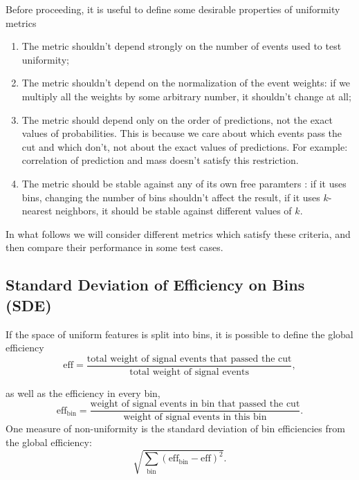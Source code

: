 Before proceeding, it is useful to define some desirable properties of uniformity metrics
\begin{enumerate}
\item
The metric shouldn't depend strongly on the number of events used to test uniformity;
\item
The metric shouldn't depend on the normalization of the event weights: if we multiply all the weights by some arbitrary number, it shouldn't change at all;
\item 
The metric should depend only on the order of predictions, not the exact values of probabilities.
This is because we care about which events pass the cut and which don't, not about the exact values of predictions.
For example: correlation of prediction and mass doesn't satisfy this restriction.
\item
The metric should be stable against any of its own free paramters : if it uses bins, changing the number of bins shouldn't affect the result,
if it uses $k$-nearest neighbors, it should be stable against different values of $k$.
\end{enumerate}
In what follows we will consider different metrics which satisfy these criteria, and then compare their performance in
some test cases.

\subsection{Standard Deviation of Efficiency on Bins (SDE)}

\def\bineff{\text{eff}_\text{bin}}
\def\binweight{\text{weight}_\text{bin}}
\def\globaleff{\text{eff}}
\def\SDE{\text{SDE}}
\def\bin{\text{bin}}

If the space of uniform features is split into bins, it is possible to define the global efficiency
\[
	\globaleff = \dfrac{
		\text{total weight of signal events that passed the cut}}
		{\text{total weight of signal events}},
\]

as well as the efficiency in every bin, 
\[
	\bineff = \dfrac{
		\text{weight of signal events in bin that passed the cut}}
		{\text{weight of signal events in this bin}}.
\]
One measure of non-uniformity is the standard deviation of bin efficiencies from the global efficiency:
\[
	\sqrt{\sum_{\bin} \left( \bineff - \globaleff \right)^2  }.
\]

